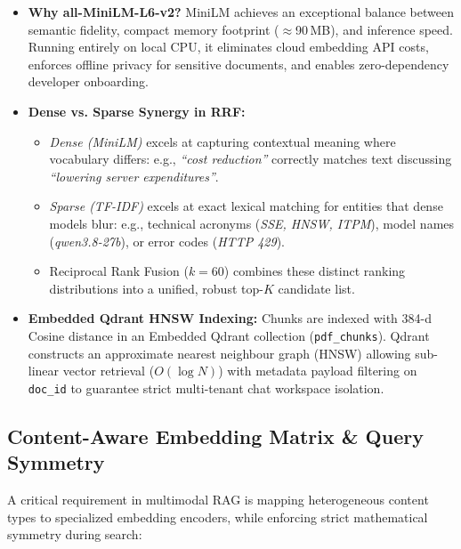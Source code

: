 \documentclass[11pt,a4paper]{article}
\begin{document}
\begin{itemize}[leftmargin=1.0cm]
\item \textbf{Why all-MiniLM-L6-v2?} MiniLM achieves an exceptional balance between semantic fidelity, compact memory footprint ($\approx$90\,MB), and inference speed. Running entirely on local CPU, it eliminates cloud embedding API costs, enforces offline privacy for sensitive documents, and enables zero-dependency developer onboarding.
\item \textbf{Dense vs. Sparse Synergy in RRF:}
\begin{itemize}[leftmargin=0.6cm]
\item \emph{Dense (MiniLM)} excels at capturing contextual meaning where vocabulary differs: e.g., \emph{``cost reduction''} correctly matches text discussing \emph{``lowering server expenditures''}.
\item \emph{Sparse (TF-IDF)} excels at exact lexical matching for entities that dense models blur: e.g., technical acronyms (\emph{SSE, HNSW, ITPM}), model names (\emph{qwen3.8-27b}), or error codes (\emph{HTTP 429}).
\item Reciprocal Rank Fusion ($k=60$) combines these distinct ranking distributions into a unified, robust top-$K$ candidate list.
\end{itemize}
\item \textbf{Embedded Qdrant HNSW Indexing:} Chunks are indexed with 384-d Cosine distance in an Embedded Qdrant collection (\texttt{pdf\_chunks}). Qdrant constructs an approximate nearest neighbour graph (HNSW) allowing sub-linear vector retrieval ($O(\log N)$) with metadata payload filtering on \texttt{doc\_id} to guarantee strict multi-tenant chat workspace isolation.
\end{itemize}

\subsection{Content-Aware Embedding Matrix \& Query Symmetry}
A critical requirement in multimodal RAG is mapping heterogeneous content types to specialized embedding encoders, while enforcing strict mathematical symmetry during search:
\end{document}
